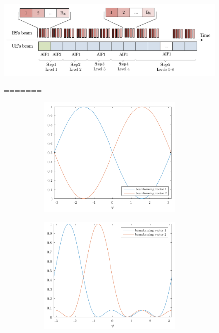 \begin{figure}[h!]
    \centering
    \includegraphics[width=0.5\linewidth]{figs/fig4.23}
    \caption{}
=======
\begin{figure}[ht!]
\centering
\begin{subfigure}{0.49\linewidth}
    \centering
    \includegraphics[width=\linewidth]{figs/fig4.20}
    \caption{}
    \label{fig:4.20}
\end{subfigure}
\begin{subfigure}{0.49\linewidth}
    \centering
    \includegraphics[width=\linewidth]{figs/fig4.21}

\end{subfigure}
\end{figure}
\end{figure}
